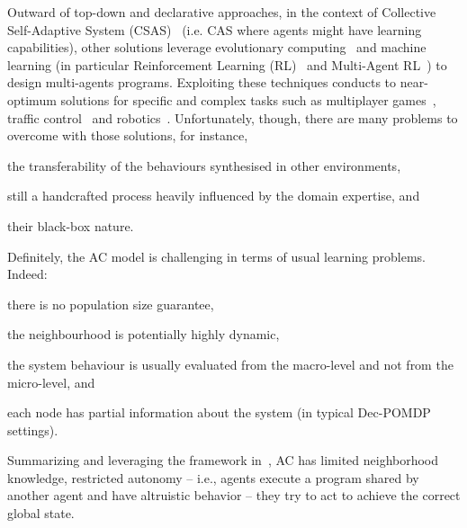 \documentclass[conference]{IEEEtran}
\begin{document}
Outward of top-down and declarative approaches, in the context of Collective Self-Adaptive System (CSAS)~\cite{DBLP:conf/metacognition/Mitchell05} (i.e. CAS where agents might have learning capabilities), other solutions leverage evolutionary computing~\cite{DBLP:journals/swarm/BrambillaFBD13} and machine learning (in particular Reinforcement Learning (RL)~\cite{DBLP:journals/access/NaeemRC20} and Multi-Agent RL~\cite{DBLP:journals/tcyb/NguyenNN20}) to design multi-agents programs.
%
Exploiting these techniques conducts to near-optimum solutions for specific and complex tasks such as multiplayer games~\cite{DBLP:journals/nature/VinyalsBCMDCCPE19, DBLP:journals/taas/HaoLM15}, traffic control~\cite{DBLP:journals/aes/JinMK17, DBLP:conf/icac/SteinTRH16} and robotics~\cite{DBLP:journals/taas/KraemerB14}.
%
Unfortunately, though, there are many problems to overcome with those solutions, for instance,
\begin{enumerate*}[label=(\roman*)]
    \item the transferability of the behaviours synthesised in other environments, 
    \item still a handcrafted process heavily influenced by the domain expertise, and
    \item their black-box nature.
\end{enumerate*}
%
Definitely, the AC model is challenging in terms of usual learning problems. Indeed:
\begin{enumerate*}[label=(\roman*)]
\item there is no population size guarantee,
\item the neighbourhood is potentially highly dynamic,
\item the system behaviour is usually evaluated from the macro-level and not from the micro-level, and
\item each node has partial information about the system (in typical Dec-POMDP~\cite{DBLP:conf/uai/BernsteinZI00} settings).
\end{enumerate*}
Summarizing and leveraging the framework in~\cite{DAngelo2019}, AC has limited neighborhood knowledge, restricted autonomy -- i.e., agents execute a program shared by another agent and have altruistic behavior -- they try to act to achieve the correct global state.
\end{document}
